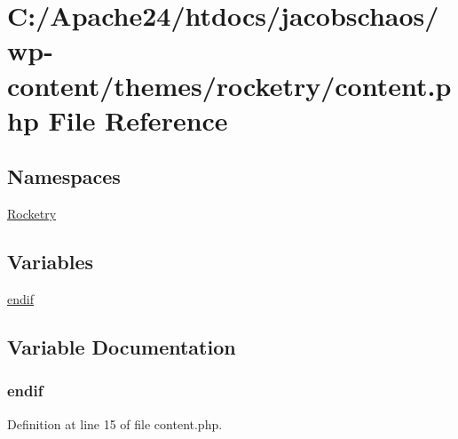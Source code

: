 \hypertarget{content_8php}{}\section{C\+:/\+Apache24/htdocs/jacobschaos/wp-\/content/themes/rocketry/content.php File Reference}
\label{content_8php}
\subsection*{Namespaces}
\begin{DoxyCompactItemize}
\item 
 \hyperlink{namespace_rocketry}{Rocketry}
\end{DoxyCompactItemize}
\subsection*{Variables}
\begin{DoxyCompactItemize}
\item 
\hyperlink{content_8php_a82cd33ca97ff99f2fcc5e9c81d65251b}{endif}
\end{DoxyCompactItemize}


\subsection{Variable Documentation}
\hypertarget{content_8php_a82cd33ca97ff99f2fcc5e9c81d65251b}{}
\subsubsection[{endif}]{\setlength{\rightskip}{0pt plus 5cm}endif}\label{content_8php_a82cd33ca97ff99f2fcc5e9c81d65251b}


Definition at line 15 of file content.\+php.

